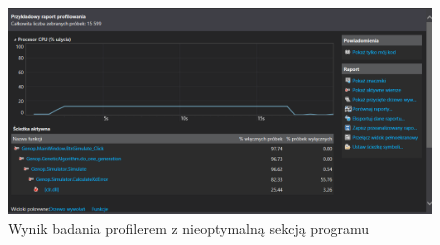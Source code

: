 \begin{figure}[!ht]
\centering
\includegraphics[scale=0.32]{algorytm}
\caption{Wynik badania profilerem z nieoptymalną sekcją programu}
\label{algorytm}
\end{figure} 
